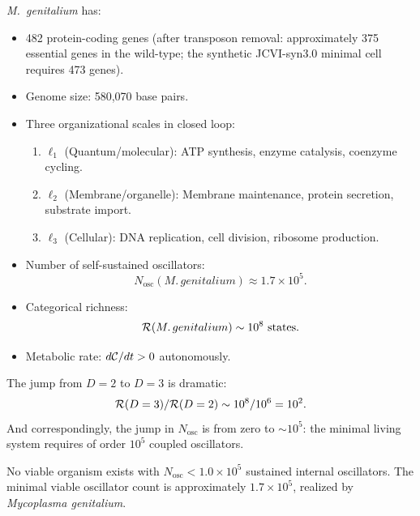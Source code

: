 \textit{M.~genitalium} has:
\begin{itemize}
  \item 482 protein-coding genes (after transposon removal: approximately
        375 essential genes in the wild-type; the synthetic JCVI-syn3.0 minimal
        cell requires 473 genes).
  \item Genome size: 580,070 base pairs.
  \item Three organizational scales in closed loop:
        \begin{enumerate}
          \item $\ell_1$ (Quantum/molecular): ATP synthesis, enzyme catalysis,
                coenzyme cycling.
          \item $\ell_2$ (Membrane/organelle): Membrane maintenance, protein
                secretion, substrate import.
          \item $\ell_3$ (Cellular): DNA replication, cell division,
                ribosome production.
        \end{enumerate}
  \item Number of self-sustained oscillators:
        \begin{equation}
          N_{\mathrm{osc}}(M.\,genitalium) \approx 1.7 \times 10^5.
          \label{eq:Nosc_mycoplasma}
        \end{equation}
  \item Categorical richness:
        \begin{equation}
          \mathcal{R}(M.\,genitalium) \sim 10^8 \text{ states}.
          \label{eq:richness_D3}
        \end{equation}
  \item Metabolic rate: $d\mathcal{C}/dt > 0$ autonomously.
\end{itemize}

The jump from $D = 2$ to $D = 3$ is dramatic:
\begin{equation}
  \mathcal{R}(D=3) / \mathcal{R}(D=2) \sim 10^8 / 10^6 = 10^2.
  \label{eq:richness_jump}
\end{equation}
And correspondingly, the jump in $N_{\mathrm{osc}}$ is from zero to
$\sim 10^5$: the minimal living system requires of order $10^5$ coupled
oscillators.

\begin{theorem}
\label{thm:min_oscillators}
No viable organism exists with $N_{\mathrm{osc}} < 1.0 \times 10^5$ sustained
internal oscillators. The minimal viable oscillator count is approximately
$1.7 \times 10^5$, realized by \textit{Mycoplasma genitalium}.
\end{theorem}

